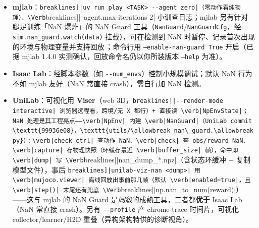 \begin{itemize}
  \item \textbf{mjlab}：\Verb[breaklines]|uv run play <TASK> --agent zero|（零动作看纯物理）、\Verb[breaklines]|--agent.max-iterations 2| 小训查日志；mjlab 另有针对腿足训练「NaN 爆炸」的 NaN Guard 工具（\texttt{NanGuard}/\allowbreak\texttt{NanGuardCfg}，经 \texttt{sim.\allowbreak nan\_guard.\allowbreak watch(data)} 挂载），可在检测到 NaN 时暂停、记录首次出现的环境与物理变量并支持回放\,\cite{mjlab2026}；命令行用 \texttt{--enable-nan-guard True} 开启（已据 mjlab 1.4.0 实测确认，回放命令名仍以你所装版本 \texttt{--help} 为准）。
  \item \textbf{Isaac Lab}：经脚本参数（如 \verb|--num_envs|）控制小规模调试；默认 NaN 行为不如 mjlab 友好（NaN 常直接 crash），需自行加 NaN 检测。
  \item \textbf{UniLab}：可视化用 \textbf{Viser}（web 3D，\Verb[breaklines]|--render-mode interactive| 浏览器远程看，跨境/无 X 都行）+ 直接读 \verb|NpEnvState|；NaN 处理是其工程亮点——\verb|NpEnv| 内建 \verb|NanGuard|（UniLab commit \texttt{99936e08}，\texttt{utils/\allowbreak nan\_guard.\allowbreak py}）：\verb|check_ctrl| 查动作 NaN、\verb|check| 查 obs/reward NaN、\verb|capture| 存物理快照（环缓存最近 \verb|buffer_size| 帧），命中即 \verb|dump| 写 \Verb[breaklines]|nan_dump_*.npz|（含状态环缓冲 + 复制模型文件），事后 \Verb[breaklines]|unilab-viz-nan <dump>| 用 \verb|mujoco.viewer| 离线回放出事前那几帧（默认 \verb|enabled=true|，且 \verb|step()| 末尾还有兜底 \Verb[breaklines]|np.nan_to_num(reward)|）——这与 mjlab 的 NaN Guard 是\emph{同级}的成熟工具，二者都\textbf{优于} Isaac Lab（NaN 常直接 crash）。另有 \verb|--profile| 产 chrome-trace 时间片，可视化 collector/learner/H2D 重叠（异构架构特供的诊断视角）。
\end{itemize}

\begin{practice}[本节练习]
\end{practice}

